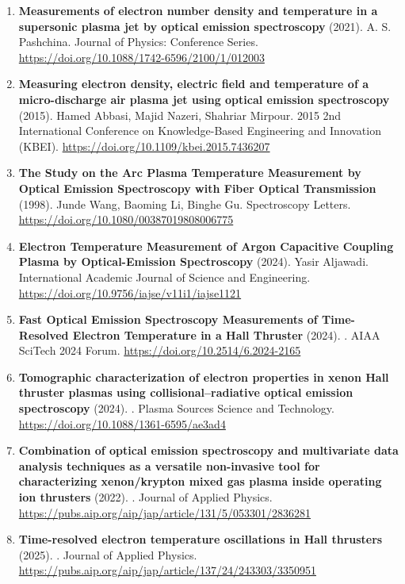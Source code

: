 \documentclass[11pt,a4paper]{article}
\begin{document}
\begin{enumerate}[leftmargin=1.4em]
\item \textbf{Measurements of electron number density and temperature in a supersonic plasma jet by optical emission spectroscopy} (2021). A. S. Pashchina. Journal of Physics: Conference Series. \url{https://doi.org/10.1088/1742-6596/2100/1/012003}
\item \textbf{Measuring electron density, electric field and temperature of a micro-discharge air plasma jet using optical emission spectroscopy} (2015). Hamed Abbasi, Majid Nazeri, Shahriar Mirpour. 2015 2nd International Conference on Knowledge-Based Engineering and Innovation (KBEI). \url{https://doi.org/10.1109/kbei.2015.7436207}
\item \textbf{The Study on the Arc Plasma Temperature Measurement by Optical Emission Spectroscopy with Fiber Optical Transmission} (1998). Junde Wang, Baoming Li, Binghe Gu. Spectroscopy Letters. \url{https://doi.org/10.1080/00387019808006775}
\item \textbf{Electron Temperature Measurement of Argon Capacitive Coupling Plasma by Optical-Emission Spectroscopy} (2024). Yasir Aljawadi. International Academic Journal of Science and Engineering. \url{https://doi.org/10.9756/iajse/v11i1/iajse1121}
\item \textbf{Fast Optical Emission Spectroscopy Measurements of Time-Resolved Electron Temperature in a Hall Thruster} (2024). . AIAA SciTech 2024 Forum. \url{https://doi.org/10.2514/6.2024-2165}
\item \textbf{Tomographic characterization of electron properties in xenon Hall thruster plasmas using collisional–radiative optical emission spectroscopy} (2024). . Plasma Sources Science and Technology. \url{https://doi.org/10.1088/1361-6595/ae3ad4}
\item \textbf{Combination of optical emission spectroscopy and multivariate data analysis techniques as a versatile non-invasive tool for characterizing xenon/krypton mixed gas plasma inside operating ion thrusters} (2022). . Journal of Applied Physics. \url{https://pubs.aip.org/aip/jap/article/131/5/053301/2836281}
\item \textbf{Time-resolved electron temperature oscillations in Hall thrusters} (2025). . Journal of Applied Physics. \url{https://pubs.aip.org/aip/jap/article/137/24/243303/3350951}
\end{enumerate}
\end{document}
